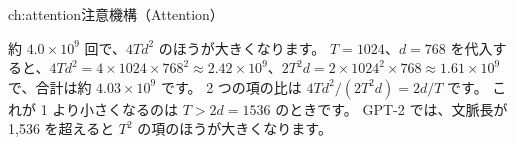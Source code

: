 \begin{answers}{ch:attention}{注意機構（Attention）}
\item 約 $4.0\times10^9$ 回で、$4Td^2$ のほうが大きくなります。
$T=1024$、$d=768$ を代入すると、$4Td^2=4\times1024\times768^2\approx2.42\times10^9$、$2T^2d=2\times1024^2\times768\approx1.61\times10^9$ で、合計は約 $4.03\times10^9$ です。
2 つの項の比は $4Td^2/(2T^2d)=2d/T$ です。
これが 1 より小さくなるのは $T>2d=1536$ のときです。
GPT-2 では、文脈長が 1,536 を超えると $T^2$ の項のほうが大きくなります。
\end{answers}
